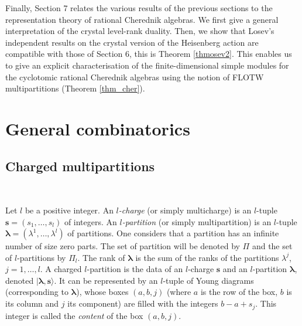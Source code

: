 \documentclass[twoside,12pt]{amsart}
\theoremstyle{plain}
\newcommand{\bs}{\mathbf{s}}
\newcommand{\la}{\lambda}
\newcommand{\bla}{\boldsymbol{\la}}
\theoremstyle{remark}
\begin{document}
Finally, Section 7 relates the various results of the previous sections
to the representation theory of rational Cherednik algebras.
We first give a general interpretation of the crystal level-rank duality.
Then, we show that Losev's independent results on the crystal version of the Heisenberg action
\cite{Losev2015} are compatible with those of Section 6, this is Theorem \ref{thmosev2}.
This enables us to give an explicit characterisation of the finite-dimensional simple
modules for the cyclotomic rational Cherednik algebras using the notion of FLOTW multipartitions
(Theorem \ref{thm_cher}).


































\section{General combinatorics}\label{gen_comb}

\subsection{Charged multipartitions}\label{charged_mp}\

Let $l$ be a positive integer.
An \textit{$l$-charge} (or simply multicharge) is an $l$-tuple $\bs=(s_1,\dots,s_l)$ of integers.
An \textit{$l$-partition} (or simply multipartition) is an $l$-tuple $\bla=(\la^1,\dots,\la^l)$ of partitions.
One considers that a partition has an infinite number of size zero parts.
The set of partition will be denoted by $\Pi$ and the set of $l$-partitions by $\Pi_l$.
The rank of $\bla$ is the sum of the ranks of the partitions $\la^j$, $j=1,\dots,l$.
A charged $l$-partition is the data of an $l$-charge $\bs$ and an $l$-partition $\bla$, denoted $|\bla,\bs\rangle$.
It can be represented by an $l$-tuple of Young diagrams (corresponding to $\bla$),
whose boxes $(a,b,j)$ (where $a$ is the row of the box, $b$ is its column and $j$ its component)
are filled with the integers $b-a+s_j$.
This integer is called the \textit{content} of the box $(a,b,j)$.
\end{document}
